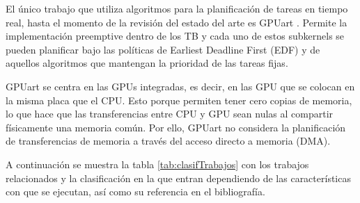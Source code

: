 El único trabajo que utiliza algoritmos para la planificación de tareas en tiempo real, hasta el momento de la revisión del estado del arte es GPUart \cite{GPUArt}. 
Permite la implementación preemptive dentro de los TB y cada uno de estos subkernels se pueden planificar bajo las políticas de Earliest Deadline First (EDF) y de aquellos algoritmos que mantengan la prioridad de las tareas fijas.

GPUart se centra en las GPUs integradas, es decir, en las GPU que se colocan en la misma placa que el CPU. Esto porque permiten tener cero copias de memoria, lo que hace que las transferencias entre CPU y GPU sean nulas al compartir físicamente una memoria común. 
Por ello, GPUart no considera la planificación de transferencias de memoria a través del acceso directo a memoria (DMA).
\newline

A continuación se muestra la tabla \ref{tab:clasifTrabajos} con los trabajos relacionados y la clasificación en la que entran dependiendo de las características con que se ejecutan, así como su referencia en el bibliografía.
 	
